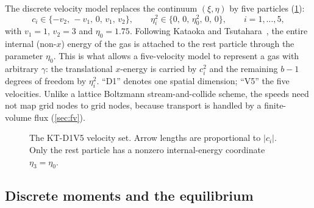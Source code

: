 \documentclass[11pt]{article}
\theoremstyle{remark}
\begin{document}
The discrete velocity model replaces the continuum $(\xi,\eta)$ by five
particles (\cref{fig:velset}):
\begin{equation}
  c_i \in \{-v_2,\,-v_1,\,0,\,v_1,\,v_2\},\qquad
  \eta_i^2 \in \{0,\,0,\,\eta_0^2,\,0,\,0\},\qquad i = 1,\dots,5,
  \label{eq:velset}
\end{equation}
with $v_1 = 1$, $v_2 = 3$ and $\eta_0 = 1.75$.  Following Kataoka and
Tsutahara~\citep{KataokaTsutahara2004Euler,KataokaTsutahara2004NS}, the entire
internal (non-$x$) energy of the gas is attached to the rest particle through the
parameter $\eta_0$.  This is what allows a five-velocity model to represent a gas
with arbitrary $\gamma$: the translational $x$-energy is carried by $c_i^2$ and the
remaining $b-1$ degrees of freedom by $\eta_i^2$.  ``D1'' denotes one spatial
dimension; ``V5'' the five velocities.  Unlike a lattice Boltzmann
stream-and-collide scheme, the speeds need not map grid nodes to grid nodes, because
transport is handled by a finite-volume flux (\cref{sec:fv}).

\begin{figure}[ht]
\centering
{}
\caption{The KT-D1V5 velocity set.  Arrow lengths are proportional to $|c_i|$.  Only the
rest particle has a nonzero internal-energy coordinate $\eta_3=\eta_0$.}
\label{fig:velset}
\end{figure}

\subsection{Discrete moments and the equilibrium}
\end{document}
